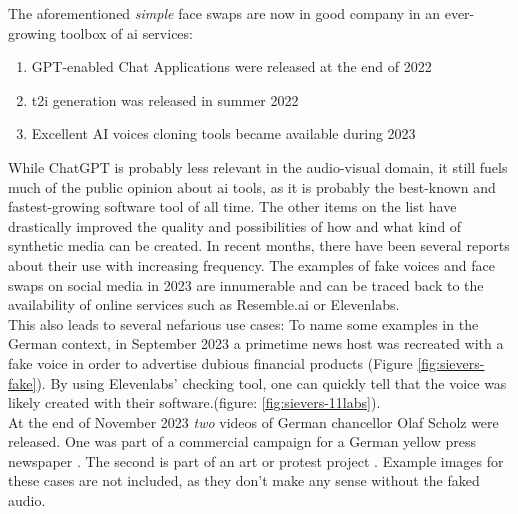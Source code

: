 \documentclass[
  a4paper,  %
  twoside,  %
  bibliography=totoc,
  headsepline,
  cleardoublepage=empty,
  parskip=half,
  draft=false
]{scrbook}
\begin{document}
The aforementioned \textit{simple} face swaps are now in good company in an ever-growing toolbox of \gls{ai} services: 
\begin{enumerate}
  \item GPT-enabled Chat Applications were released at the end of 2022
  \item \gls{t2i} generation was released in summer 2022
  \item Excellent AI voices cloning tools became available during 2023
\end{enumerate}
While ChatGPT is probably less relevant in the audio-visual domain, it still fuels much of the public opinion about \gls{ai} tools, as it is probably the best-known and fastest-growing software tool of all time. The other items on the list have drastically improved the quality and possibilities of how and what kind of synthetic media can be created. In recent months, there have been several reports about their use with increasing frequency. The examples of fake voices and face swaps on social media in 2023 are innumerable and can be traced back to the availability of online services such as Resemble.ai or Elevenlabs. \\
This also leads to several nefarious use cases: To name some examples in the German context, in September 2023 a primetime news host was recreated with a fake voice in order to advertise dubious financial products (Figure \ref{fig:sievers-fake}). By using Elevenlabs' checking tool, one can quickly tell that the voice was likely created with their software.(figure: \ref{fig:sievers-11labs}). \\
At the end of November 2023 \textit{two} videos of German chancellor Olaf Scholz were released. One was part of a commercial campaign for a German yellow press newspaper \cite{dwdl.deSpringerTrommeltMit}. The second is part of an art or protest project \cite{zdfKunstinstallationDeepfakeScholzVerkuendet}. Example images for these cases are not included, as they don't make any sense without the faked audio. 
\end{document}
